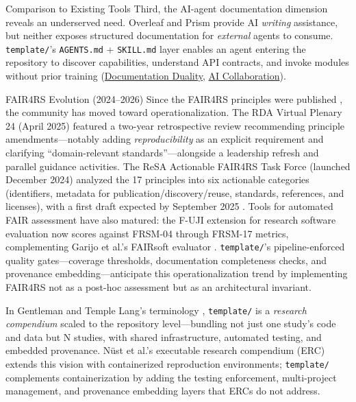 \documentclass[
  ignorenonframetext,
]{beamer}
\begin{document}
\begin{frame}{Comparison to Existing Tools}
Third, the AI-agent documentation dimension reveals an underserved need.
Overleaf and Prism provide AI \emph{writing} assistance, but neither
exposes structured documentation for \emph{external} agents to consume.
\texttt{template/}'s \texttt{AGENTS.md} + \texttt{SKILL.md} layer
enables an agent entering the repository to discover capabilities,
understand API contracts, and invoke modules without prior training
(\href{03c_documentation.md\#documentation-duality-and-ai-collaboration}{Documentation
Duality}, \href{05d_ai_collaboration.md\#the-ai-collaboration-model}{AI
Collaboration}).

\begin{block}{FAIR4RS Evolution (2024--2026)}
\protect{}\label{fair4rs-evolution-20242026}
Since the FAIR4RS principles were published ,
the community has moved toward operationalization. The RDA Virtual
Plenary 24 (April 2025) featured a two-year retrospective review
 recommending principle amendments---notably
adding \emph{reproducibility} as an explicit requirement and clarifying
``domain-relevant standards''---alongside a leadership refresh and
parallel guidance activities. The ReSA Actionable FAIR4RS Task Force
(launched December 2024) analyzed the 17 principles into six actionable
categories (identifiers, metadata for publication/discovery/reuse,
standards, references, and licenses), with a first draft expected by
September 2025 . Tools for automated FAIR
assessment have also matured: the F-UJI extension for research software
evaluation now scores against FRSM-04 through FRSM-17 metrics,
complementing Garijo et al.'s FAIRsoft evaluator
. \texttt{template/}'s pipeline-enforced
quality gates---coverage thresholds, documentation completeness checks,
and provenance embedding---anticipate this operationalization trend by
implementing FAIR4RS not as a post-hoc assessment but as an
architectural invariant.

In Gentleman and Temple Lang's terminology ,
\texttt{template/} is a \emph{research compendium} scaled to the
repository level---bundling not just one study's code and data but N
studies, with shared infrastructure, automated testing, and embedded
provenance. Nüst et al.'s executable research compendium (ERC)
 extends this vision with containerized
reproduction environments; \texttt{template/} complements
containerization by adding the testing enforcement, multi-project
management, and provenance embedding layers that ERCs do not address.
\end{block}
\end{frame}
\end{document}
